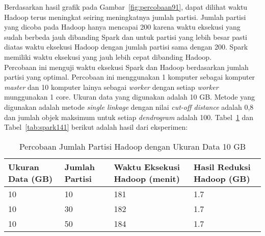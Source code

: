 Berdasarkan hasil grafik pada Gambar~\ref{fig:percobaan91}, dapat dilihat waktu Hadoop terus meningkat seiring meningkatnya jumlah partisi. Jumlah partisi yang dicoba pada Hadoop hanya mencapai 200 karena waktu eksekusi yang sudah berbeda jauh dibanding Spark dan untuk partisi yang lebih besar pasti diatas waktu eksekusi Hadoop dengan jumlah partisi sama dengan 200. Spark memiliki waktu eksekusi yang jauh lebih cepat dibanding Hadoop.  \\



Percobaan ini menguji waktu eksekusi Spark dan Hadoop berdasarkan jumlah partisi yang optimal. Percobaan ini menggunakan 1 komputer sebagai komputer \textit{master} dan 10 komputer lainya sebagai \textit{worker} dengan setiap \textit{worker} munggunakan 1 core. Ukuran data yang digunakan adalah 10 GB. Metode yang digunakan adalah metode \textit{single linkage} dengan nilai \textit{cut-off distance} adalah 0,8 dan jumlah objek maksimum untuk setiap \textit{dendrogram} adalah 100. Tabel~\ref{tab:spark131} dan Tabel~\ref{tab:spark141} berikut adalah hasil dari eksperimen:





\begin{table}[H] 
	\centering 
	\caption{Percobaan Jumlah Partisi Hadoop dengan Ukuran Data 10 GB}
	\label{tab:spark131}
	\begin{tabular}{|p{3cm}|p{3cm}|p{4cm}|p{4cm}|}
\hline
Ukuran Data (GB) & Jumlah Partisi &  Waktu Eksekusi Hadoop (menit) & Hasil Reduksi Hadoop (GB)\\
\hline
10 & 10 & 181  & 1.7  \\
\hline
10 & 30 & 182  & 1.7  \\
\hline
10 & 50 & 184  & 1.7   \\
\hline


\hline

	\end{tabular} 
\end{table}




